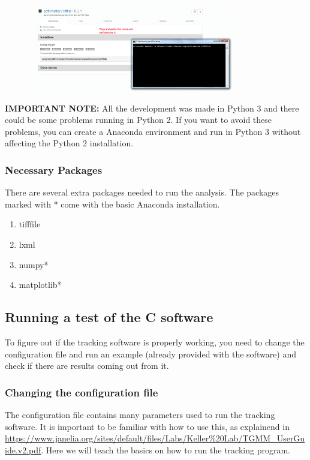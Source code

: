 \documentclass[12pt]{article}
\begin{document}
\begin{figure}[h]
\centering
\includegraphics[width=0.8\textwidth]{binstar_install.png}
\end{figure}

\textbf{IMPORTANT NOTE:} All the development was made in Python 3 and there could be some problems running in Python 2. If you want to avoid these problems, you can create a Anaconda environment and run in Python 3 without affecting the Python 2 installation.

\subsubsection{Necessary Packages}

There are several extra packages needed to run the analysis. The packages marked with * come with the basic Anaconda installation.

\begin{enumerate}
\item{tifffile}
\item{lxml}
\item{numpy*}
\item{matplotlib*}
\end{enumerate}

\subsection{Running a test of the C software}

To figure out if the tracking software is properly working, you need to change the configuration file and run an example (already provided with the software) and check if there are results coming out from it.

\subsubsection{Changing the configuration file}

The configuration file contains many parameters used to run the tracking software. It is important to be familiar with how to use this, as explainend in \url{https://www.janelia.org/sites/default/files/Labs/Keller%20Lab/TGMM_UserGuide.v2.pdf}. Here we will teach the basics on how to run the tracking program.
\end{document}

